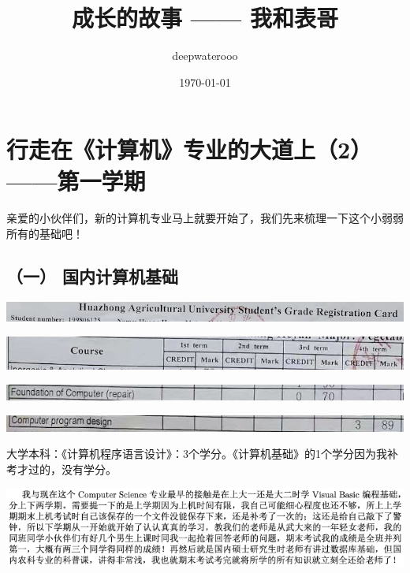 \documentclass[9pt, b5paper]{article}
\author{deepwaterooo}
\date{\today}
\title{成长的故事 —— 我和表哥}
\begin{document}
\maketitle
\tableofcontents


\section{行走在《计算机》专业的大道上（2）——第一学期}
\label{sec:org478f3e8}

亲爱的小伙伴们，新的计算机专业马上就要开始了，我们先来梳理一下这个小弱弱所有的基础吧！

\subsection{（一） 国内计算机基础}
\label{sec:org8626563}

\begin{center}
\includegraphics[width=.9\linewidth]{./pic/backups_plans_20210419_095006.png}
\end{center}

\begin{center}
\includegraphics[width=.9\linewidth]{./pic/backups_plans_20210419_093849.png}
\end{center}

\begin{center}
\includegraphics[width=.9\linewidth]{./pic/backups_plans_20210419_093428.png}
\end{center}

\begin{center}
\includegraphics[width=.9\linewidth]{./pic/backups_plans_20210419_093456.png}
\end{center}

大学本科：《计算机程序语言设计》：3个学分。《计算机基础》的1个学分因为我补考才过的，没有学分。

\begin{center}
\includegraphics[width=.9\linewidth]{./pic/backups_plans_20210421_134744.png}
\end{center}
\end{document}
